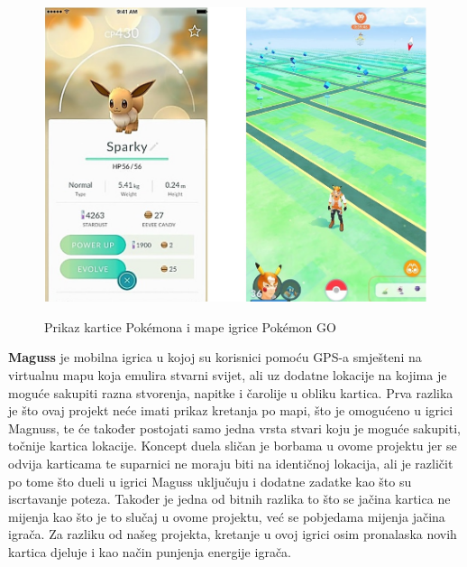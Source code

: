 		\begin{figure}[H]
			\centering
			\includegraphics[scale=0.45]{slike/PokemonGO} \\%
			\caption{Prikaz kartice Pokémona i mape igrice Pokémon GO}
			\label{fig:PokemonGO} %
		\end{figure}
	
		\textnormal{\textbf{Maguss} je mobilna igrica u kojoj su korisnici pomoću GPS-a smješteni na virtualnu mapu koja emulira stvarni svijet, ali uz dodatne lokacije na kojima je moguće sakupiti razna stvorenja, napitke i čarolije u obliku kartica. Prva razlika je što ovaj projekt neće imati prikaz kretanja po mapi, što je omogućeno u igrici Magnuss, te će također postojati samo jedna vrsta stvari koju je moguće sakupiti, točnije kartica lokacije. Koncept duela sličan je borbama u ovome projektu jer se odvija karticama te suparnici ne moraju biti na identičnoj lokacija, ali je različit po tome što dueli u igrici Maguss uključuju i dodatne zadatke kao što su iscrtavanje poteza. Također je jedna od bitnih razlika to što se jačina kartica ne mijenja kao što je to slučaj u ovome projektu, već se pobjedama mijenja jačina igrača. Za razliku od našeg projekta, kretanje u ovoj igrici osim pronalaska novih kartica djeluje i kao način punjenja energije igrača.   }
		
